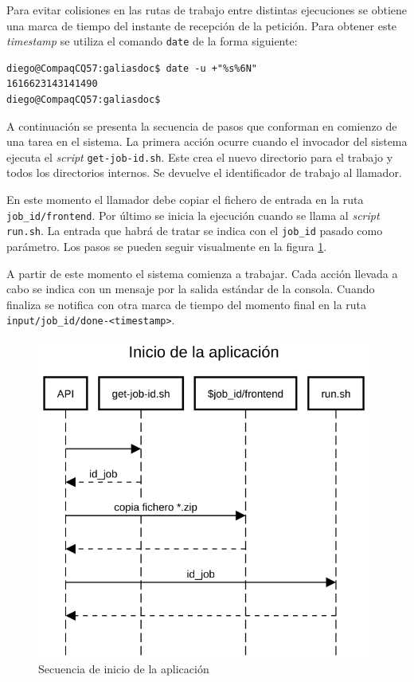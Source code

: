 Para evitar colisiones en las rutas de trabajo entre distintas ejecuciones se obtiene una marca de tiempo del instante de recepción de la petición. Para obtener este \emph{timestamp} se utiliza el comando \verb|date| de la forma siguiente:

\begin{verbatim}
diego@CompaqCQ57:galiasdoc$ date -u +"%s%6N"
1616623143141490
diego@CompaqCQ57:galiasdoc$
\end{verbatim}

A continuación se presenta la secuencia de pasos que conforman en comienzo de una tarea en el sistema. La primera acción ocurre cuando el invocador del sistema ejecuta el \emph{script} \verb|get-job-id.sh|. Este crea el nuevo directorio para el trabajo y todos los directorios internos. Se devuelve el identificador de trabajo al llamador.

En este momento el llamador debe copiar el fichero de entrada en la ruta \verb|job_id/frontend|. Por último se inicia la ejecución cuando se llama al \emph{script} \verb|run.sh|. La entrada que habrá de tratar se indica con el \verb|job_id| pasado como parámetro. Los pasos se pueden seguir visualmente en la figura \ref{fig:inicio-aplicacion}.

A partir de este momento el sistema comienza a trabajar. Cada acción llevada a cabo se indica con un mensaje por la salida estándar de la consola. Cuando finaliza se notifica con otra marca de tiempo del momento final en la ruta \verb|input/job_id/done-<timestamp>|.

\begin{figure}[hp!]
  \centering
  \includegraphics[width=11cm]{imaxes/inicio-aplicacion.png}
  \caption{Secuencia de inicio de la aplicación}
  \label{fig:inicio-aplicacion}
\end{figure}

